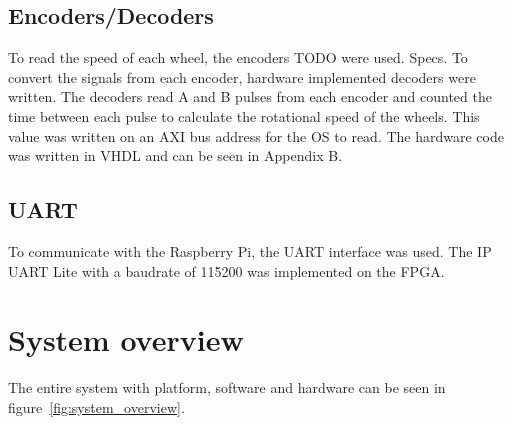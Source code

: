 \subsection{Encoders/Decoders}
To read the speed of each wheel, the encoders TODO were used. Specs. To convert the signals from each encoder, hardware implemented decoders were written. The decoders read A and B pulses from each encoder and counted the time between each pulse to calculate the rotational speed of the wheels. This value was written on an AXI bus address for the OS to read. The hardware code was written in VHDL and can be seen in Appendix B.

\subsection{UART}
To communicate with the Raspberry Pi, the UART interface was used. The IP UART Lite with a baudrate of 115200 was implemented on the FPGA.

\section{System overview}
The entire system with platform, software and hardware can be seen in figure~\ref{fig:system_overview}.

